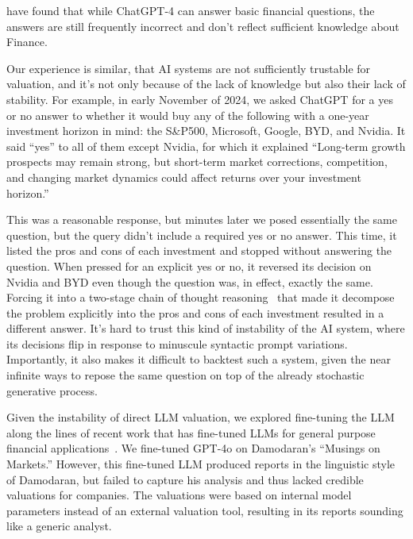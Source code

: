 \documentclass[]{interact}
\theoremstyle{plain}%
\theoremstyle{definition}
\theoremstyle{remark}
\begin{document}
\citet{fairhurst2025how} have found that while ChatGPT-4 can answer basic financial questions, the answers are still frequently incorrect and don’t reflect sufficient knowledge about Finance.

Our experience is similar, that AI systems are not sufficiently trustable for valuation, and it's not only because of the lack of knowledge but also their lack of stability. For example, in early November of 2024, we asked ChatGPT for a yes or no answer to whether it would buy any of the following with a one-year investment horizon in mind: the S\&P500, Microsoft, Google, BYD, and Nvidia. It said ``yes'' to all of them except Nvidia, for which it explained ``Long-term growth prospects may remain strong, but short-term market corrections, competition, and changing market dynamics could affect returns over your investment horizon.''

This was a reasonable response, but minutes later we posed essentially the same question, but the query didn’t include a required yes or no answer. This time, it listed the pros and cons of each investment and stopped without answering the question. When pressed for an explicit yes or no, it reversed its decision on Nvidia and BYD even though the question was, in effect, exactly the same.  Forcing it into a two-stage chain of thought reasoning~\citep{wei2022chain} that made it decompose the problem explicitly into the pros and cons of each investment resulted in a different answer. It’s hard to trust this kind of instability of the AI system, where its decisions flip in response to minuscule syntactic prompt variations. Importantly, it also makes it difficult to backtest such a system, given the near infinite ways to repose the same question on top of the already stochastic generative process.

Given the instability of direct LLM valuation, we explored fine-tuning the LLM along the lines of recent work that has fine-tuned LLMs for general purpose financial applications~\cite[][et alia]{wu2023bloomberggpt,xie2023pixiu,zhang2023instruct,wang2023finvis,bhatia-etal-2024-fintral}. We fine-tuned GPT-4o on Damodaran's ``Musings on Markets.'' However, this fine-tuned LLM produced reports in the linguistic style of Damodaran, but failed to capture his analysis and thus lacked credible valuations for companies. The valuations were based on internal model parameters instead of an external valuation tool, resulting in its reports sounding like a generic analyst. 
\end{document}
